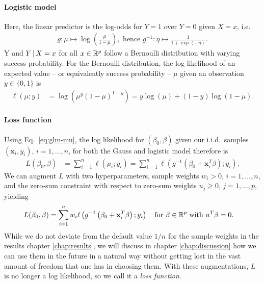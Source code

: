 \paragraph{Logistic model}
Here, the linear predictor is the log-odds for $Y = 1$ over $Y = 0$ given $X = x$, i.e.
\begin{align}
    g: \mu \mapsto \log\left( \frac{\mu}{1 - \mu} \right), \text{ hence } g^{-1}: \eta \mapsto
    \frac{1}{1 + \exp(-\eta)}.
\end{align}
Y and $Y \,|\, X = x$ for all $x \in \mathbb{R}^p$ follow a Bernoulli distribution with varying success 
probability. For the Bernoulli distribution, the log likelihood of an expected value -- or 
equivalently success probability -- $\mu$ given an observation $y \in \{0, 1\}$ is
\begin{align}
    \ell(\mu; y) &= \log\left( \mu^{y} (1 - \mu)^{1 - y} \right) 
    = y \log(\mu) + (1 - y) \log(1 - \mu). 
\end{align}

\paragraph{Loss function}
Using Eq.\ \eqref{eq:glm-mu}, the log likelihood for $(\beta_0, \beta)$ given our i.i.d.\ samples 
$(\mathbf{x}_i, y_i)$, $i = 1, \ldots, n$, for both the Gauss and logistic model therefore is
\begin{align}
    L(\beta_0, \beta) &= \sum_{i=1}^n \ell(\mu_i; y_i) 
    = \sum_{i=1}^n \ell\left( g^{-1}\left( \beta_0 + \mathbf{x}_i^T \beta \right); y_i \right).
\end{align}
We can augment $L$ with two hyperparameters, sample weights $w_i > 0$, $i = 1, \ldots, n$, and the 
zero-sum constraint with respect to zero-sum weights $u_j \geq 0$, $j = 1, \ldots, p$, yielding 
\begin{align} \label{eq:loss-glm-no-lasso}
    L(\beta_0, \beta) &= \sum_{i=1}^n w_i \ell\left( g^{-1}\left( \beta_0 + \mathbf{x}_i^T \beta \right); 
    y_i \right) \quad \text{for } \beta \in \mathbb{R}^p \text{ with } u^T \beta = 0.
\end{align}
While we do not deviate from the default value $1/n$ for the sample weights in the results chapter 
\ref{chap:results}, we will discuss in chapter \ref{chap:discussion} how we can use them in the 
future in a natural way without getting lost in the vast amount of freedom that one has in 
choosing them. 
With these augmentations, $L$ is no longer a log likelihood, so we call it a \textit{loss function}.

